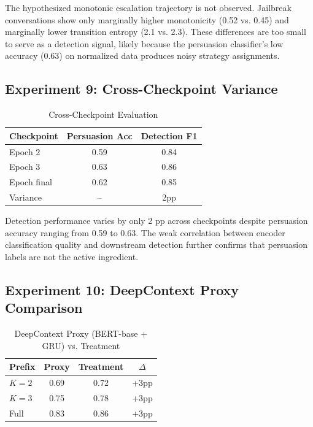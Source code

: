 \documentclass[11pt]{article}
\begin{document}
The hypothesized monotonic escalation trajectory is not observed. Jailbreak conversations show only marginally higher monotonicity (0.52 vs. 0.45) and marginally lower transition entropy (2.1 vs. 2.3). These differences are too small to serve as a detection signal, likely because the persuasion classifier's low accuracy (0.63) on normalized data produces noisy strategy assignments.

\subsection{Experiment 9: Cross-Checkpoint Variance}

\begin{table}[h]
\centering
\caption{Cross-Checkpoint Evaluation}
\label{tab:checkpoint}
\begin{tabular}{lcc}
\toprule
\textbf{Checkpoint} & \textbf{Persuasion Acc} & \textbf{Detection F1} \\
\midrule
Epoch 2 & 0.59 & 0.84 \\
Epoch 3 & 0.63 & 0.86 \\
Epoch final & 0.62 & 0.85 \\
\midrule
Variance & -- & 2pp \\
\bottomrule
\end{tabular}
\end{table}

Detection performance varies by only 2 pp across checkpoints despite persuasion accuracy ranging from 0.59 to 0.63. The weak correlation between encoder classification quality and downstream detection further confirms that persuasion labels are not the active ingredient.

\subsection{Experiment 10: DeepContext Proxy Comparison}

\begin{table}[h]
\centering
\caption{DeepContext Proxy (BERT-base + GRU) vs. Treatment}
\label{tab:deepcontext}
\begin{tabular}{lccc}
\toprule
\textbf{Prefix} & \textbf{Proxy} & \textbf{Treatment} & \textbf{$\Delta$} \\
\midrule
$K=2$ & 0.69 & 0.72 & +3pp \\
$K=3$ & 0.75 & 0.78 & +3pp \\
Full & 0.83 & 0.86 & +3pp \\
\bottomrule
\end{tabular}
\end{table}
\end{document}
